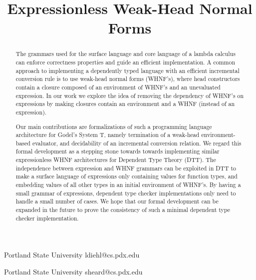 \documentclass[preprint,authoryear]{sigplanconf}
\begin{document}
\setlength{\pdfpageheight}{\paperheight}
\setlength{\pdfpagewidth}{\paperwidth}






\title{Expressionless Weak-Head Normal Forms}

           {Portland State University}
           {ldiehl@cs.pdx.edu}

           {Portland State University}
           {sheard@cs.pdx.edu}

\maketitle

\begin{abstract}
The grammars used for the surface language and core language of a lambda
calculus can enforce correctness properties and guide an efficient
implementation. A common approach to implementing a dependently typed
language with an efficient incremental conversion rule is to use
weak-head normal forms (WHNF's), where head constructors contain a closure
composed of an environment of WHNF's and an unevaluated expression. In
our work we explore the idea of removing the dependency of WHNF's on
expressions by making closures contain an environment and a WHNF
(instead of an expression).

Our main contributions are formalizations
of such a programming language architecture for Godel's System T,
namely termination of a weak-head environment-based evaluator, and
decidability of an incremental conversion relation. We regard this
formal development as a stepping stone towards towards implementing
similar expressionless WHNF architectures for Dependent Type Theory (DTT).
The independence between expression and WHNF grammars can be exploited
in DTT to make a surface language of expressions only containing
values for function types, and embedding values of all other types in
an initial environment of WHNF's. By having a small grammar of
expressions, dependent type checker implementations only need to
handle a small number of cases. We hope that our formal development
can be expanded in the future to prove the consistency of such a
minimal dependent type checker implementation.
\end{abstract}
\end{document}
